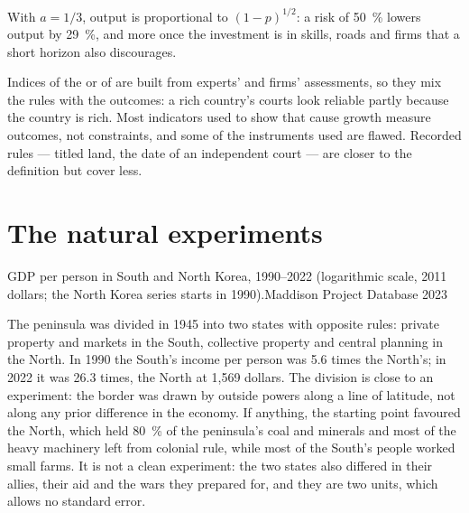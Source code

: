 With $a = 1/3$, output is proportional to $(1 - p)^{1/2}$: a risk of 50~\% lowers output by 29~\%, and more once the
investment is in skills, roads and firms that a short horizon also discourages.

\begin{measure}
Indices of the  or of  are built from experts' and
firms' assessments, so they mix the rules with the outcomes: a rich country's
courts look reliable partly because the country is rich. Most indicators used to
show that  cause growth measure outcomes, not constraints, and some of
the instruments used are flawed. %
Recorded rules --- titled land, the date of an independent court --- are closer to
the definition but cover less.
\end{measure}

\section{The natural experiments}\label{sec:b3:institutions:experiments}

\begin{omchart}{GDP per person in South and North Korea, 1990--2022 (logarithmic scale, 2011
dollars; the North Korea series starts in 1990).}{Maddison Project Database 2023}
\end{omchart}

The peninsula was divided in 1945 into two states with opposite rules: private
property and markets in the South, collective property and central planning in the
North. In 1990 the South's income per person was 5.6 times the North's; in 2022 it was 26.3 times, the
North at 1{,}569 dollars. The division is close to an experiment: the border was drawn by
outside powers along a line of latitude, not along any prior difference in the
economy. If anything, the starting point favoured the North, which held 80~\% of the
peninsula's coal and minerals and most of the heavy machinery left from colonial rule,
while most of the South's people worked small farms. %
It is not a clean experiment: the two states also differed in their allies, their
aid and the wars they prepared for, and they are two units, which allows no
standard error.

